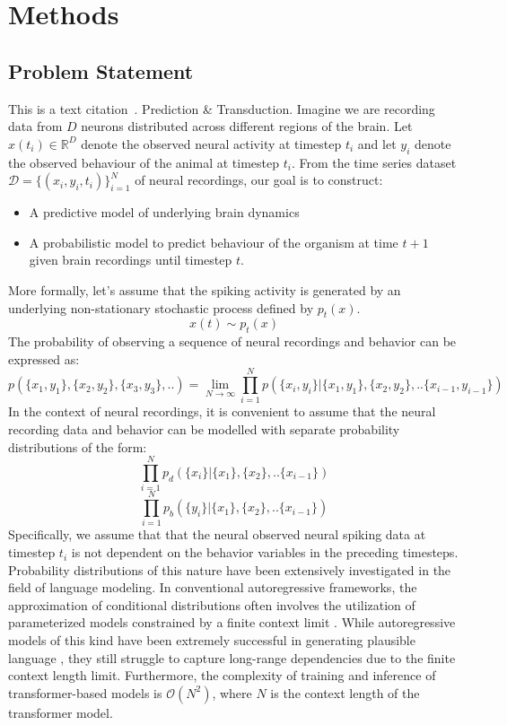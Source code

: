 \chapter{Methods}
\section{Problem Statement}

This is a text citation~\cite{Knight2021}. Prediction & Transduction. 
Imagine we are recording data from $D$ neurons distributed across different regions of the brain. Let $x(t_i) \in \mathbb{R}^D$ denote the observed neural activity at timestep $t_i$ and let $y_i$ denote the observed behaviour of the animal at timestep $t_i$. From the time series dataset $\mathcal{D} = \{(x_i,y_i,t_i) \}_{i=1}^N$ of neural recordings, our goal is to
construct:
\begin{itemize}
    \item A predictive model of underlying brain dynamics
    \item A probabilistic model to predict behaviour of the organism at time $t+1$ given brain recordings until timestep $t$.
\end{itemize}
More formally, let's assume that the spiking activity is generated by an underlying non-stationary stochastic process defined by $p_t(x)$. 
\begin{equation}
    x(t) \sim p_t(x)
\end{equation}
The probability of observing a sequence of neural recordings and behavior can be expressed as:
\begin{equation}
    p( \{x_1,y_1\},\{x_2,y_2\},\{x_3,y_3\},..) = 
    \lim_{N \to \infty} \prod_{i=1}^{N} p(\{x_{i},y_{i}\}| \{x_1,y_1\},\{x_2,y_2\},..\{x_{i-1},y_{i-1}\})
\end{equation}
In the context of neural recordings, it is convenient to assume that the neural recording data and behavior can be modelled with separate probability distributions of the form:
\begin{equation}
   \prod_{i=1}^{N} p_d(\{x_{i}\}| \{x_1\},\{x_2\},..\{x_{i-1}\})
\end{equation}
\begin{equation}
   \prod_{i=1}^{N} p_b(\{y_{i}\}| \{x_1\},\{x_2\},..\{x_{i-1}\})
\end{equation}
Specifically, we assume that that the neural observed neural spiking data at timestep $t_i$ is not dependent on the behavior variables in the preceding timesteps. Probability distributions of this nature have been extensively investigated in the field of language modeling. In conventional autoregressive frameworks, the approximation of conditional distributions often involves the utilization of parameterized models constrained by a finite context limit \cite{vaswani2017attention}. While autoregressive models of this kind have been extremely successful in generating plausible language \cite{radford2018improving}, they still struggle to capture long-range dependencies due to the finite context length limit\cite{hahn2020theoretical}. Furthermore, the complexity of training and inference of transformer-based models is $\mathcal{O}(N^2)$, where $N$ is the context length of the transformer model.\\
